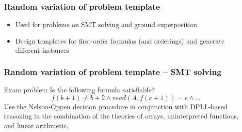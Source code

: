 \documentclass[xcolor={table}]{beamer}
\begin{document}


\begin{frame}
  \frametitle{Random variation of problem template}
\begin{itemize}
\item Used for problems on SMT solving and ground superposition
\item Design templates for first-order formulas (and orderings)
  and generate different instances
\end{itemize}
\end{frame}



\begin{frame}
    \frametitle{Random variation of problem template -- SMT solving}

    \begin{block}{Exam problem}
        Is the following formula satisfiable?
        \[
            f(b+1) \neq b+2
            \land
            read(A,f(c+1))=c
            \land
            \dots
        \]
        Use the Nelson-Oppen decision procedure
        in conjunction with DPLL-based reasoning
        in the combination of the theories of
        arrays, uninterpreted functions, and linear arithmetic.
    \end{block}
\end{frame}
\end{document}
